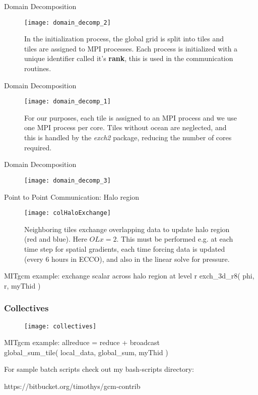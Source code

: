 \documentclass[pdf]{beamer}
\begin{document}
 \begin{frame}{Domain Decomposition}
	\begin{figure}
	\centering
	\texttt{[image: domain\_decomp\_2]}
	\caption{In the initialization process, the global grid is split into tiles and tiles are assigned to MPI processes. Each process is initialized with a unique identifier called it's \textbf{rank}, this is used in the communication routines.} 
	\end{figure}

 \end{frame}

 \begin{frame}{Domain Decomposition}
	\begin{figure}
	\centering
	\texttt{[image: domain\_decomp\_1]}
	\caption{For our purposes, each tile is assigned to an MPI process and we use one MPI process per core. Tiles without ocean are neglected, and this is handled by the \textit{exch2} package, reducing the number of cores required.}
	\end{figure}
 \end{frame}

 \begin{frame}{Domain Decomposition}
	\begin{figure}
	\centering
	\texttt{[image: domain\_decomp\_3]}
	\end{figure}
 \end{frame}

 \begin{frame}{Point to Point Communication: Halo region}
	\begin{figure}
	\centering
	\texttt{[image: colHaloExchange]}
	\caption{Neighboring tiles exchange overlapping data to update halo region (red and blue). Here $OLx=2$. This must be performed e.g. at each time step for spatial gradients, each time forcing data is updated (every 6 hours in ECCO), and also in the linear solve for pressure.}
	\end{figure}
	MITgcm example: exchange scalar across halo region at level r
	exch\_3d\_r8( phi, r, myThid )
 \end{frame}

 \begin{frame}[fragile]
 \frametitle{Collectives}
	\begin{figure}
	\centering
	\texttt{[image: collectives]}
	\end{figure}
	MITgcm example: allreduce = reduce + broadcast \\
	global\_sum\_tile( local\_data, global\_sum, myThid )
\end{frame}

 \begin{frame}
  For sample batch scripts check out my bash-scripts directory: 
  \begin{block}
  https://bitbucket.org/timothys/gcm-contrib
  \end{block}
 \end{frame}
\end{document}
